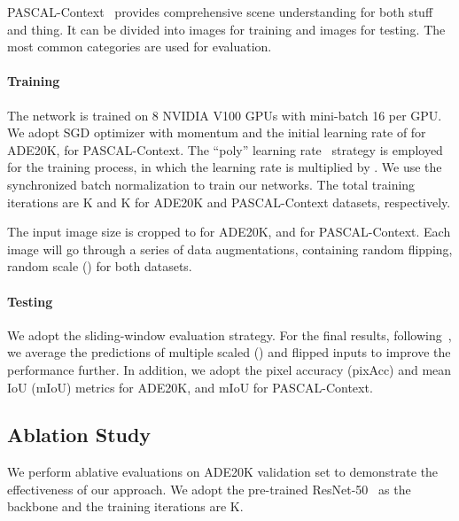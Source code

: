 \documentclass[journal]{IEEEtran}
\begin{document}
PASCAL-Context~\cite{PASCAL-Context} provides comprehensive scene understanding 
for both stuff and thing.
It can be divided into  images for training 
and  images for testing. 
The most common  categories are used for evaluation.

\paragraph{Training}
The network is trained on 8 NVIDIA V100 GPUs with mini-batch 16 per GPU.
We adopt SGD optimizer with  momentum and the initial learning rate of  for ADE20K,  for PASCAL-Context.
The ``poly'' learning rate~\cite{Chen-ECCV-Deeplabv3p-2018, Yu-CVPR-DFN-2018, Yu-CVPR-CPNet-2020} strategy is employed for the training process, 
in which the learning rate is multiplied by .
We use the synchronized batch normalization to train our networks.
The total training iterations are K and K for ADE20K and PASCAL-Context datasets, respectively.

The input image size is cropped to  for ADE20K, and  for PASCAL-Context.
Each image will go through a series of data augmentations,
containing random flipping, random scale () for both datasets.

\paragraph{Testing}
We adopt the sliding-window evaluation strategy.
For the final results,
following~\cite{Zhao-CVPR-PSPNet-2017, Chen-ECCV-Deeplabv3p-2018, Yu-CVPR-CPNet-2020},
we average the predictions of multiple scaled () and flipped inputs 
to improve the performance further. 
In addition, we adopt the pixel accuracy (pixAcc) and mean IoU (mIoU) metrics for ADE20K, and mIoU for PASCAL-Context.








\subsection{Ablation Study}
We perform ablative evaluations on ADE20K validation set 
to demonstrate the effectiveness of our approach.
We adopt the pre-trained ResNet-50~\cite{He-CVPR-ResNet-2016} as the backbone 
and the training iterations are K.
\end{document}
